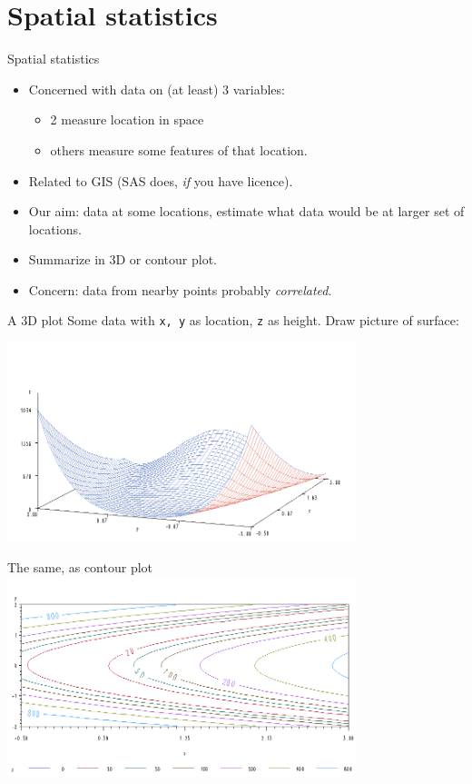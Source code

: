 \section{Spatial statistics}

\begin{frame}{Spatial statistics}

  \begin{itemize}
  \item Concerned with data on (at least) 3 variables:
    \begin{itemize}
    \item 2 measure location in space
    \item others measure some features of that location.
    \end{itemize}
  \item Related to GIS (SAS does, \emph{if} you have licence).
  \item Our aim: data at some locations, estimate what data would be
    at larger set of locations.
  \item Summarize in 3D or contour plot.
  \item Concern: data from nearby points probably \emph{correlated}.
  \end{itemize}

\end{frame}


\begin{frame}{A 3D plot}
  Some data with \texttt{x, y} as location, \texttt{z} as height. Draw
  picture of surface:

  \includegraphics[width=4in]{banana1}


\end{frame}

\begin{frame}{The same, as contour plot}
  \includegraphics[width=4in]{banana2}
\end{frame}

